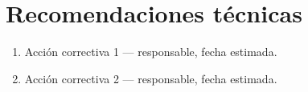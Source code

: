 \documentclass{../base/canon}
\begin{document}
\section{Recomendaciones técnicas}

\begin{enumerate}
  \item Acción correctiva 1 — responsable, fecha estimada.
  \item Acción correctiva 2 — responsable, fecha estimada.
\end{enumerate}


\ContactSignature
\end{document}
